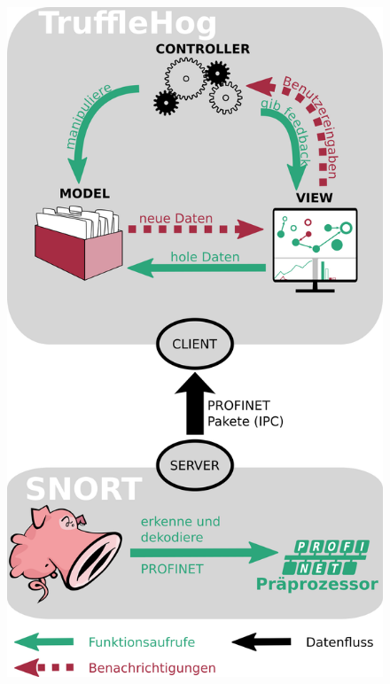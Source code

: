 \documentclass[18pt]{beamer}
\begin{document}
\begin{frame}
\begin{figure}
	\centering
	\includegraphics[height=0.9\textheight]{./images/intro_diagram.png}
\end{figure}
\end{frame}



\appendix
\beginbackup


\backupend
\end{document}
